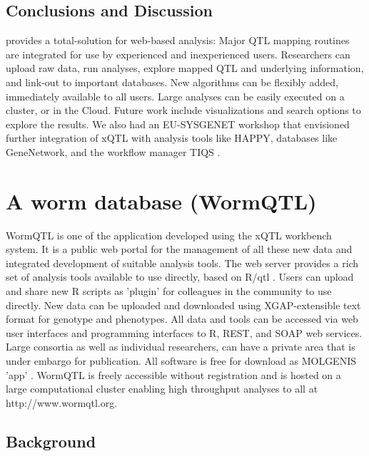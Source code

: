 \subsection{Conclusions and Discussion}
\xqtlwb provides a total-solution for web-based analysis: Major QTL mapping routines are integrated 
for use by experienced and inexperienced users. Researchers can upload raw data, run analyses, explore 
mapped QTL and underlying information, and link-out to important databases. New algorithms can be 
flexibly added, immediately available to all users. Large analyses can be easily executed on a cluster, 
or in the Cloud. Future work include visualizations and search options to explore the results. We also 
had an EU-SYSGENET workshop that envisioned further integration of xQTL with analysis tools like HAPPY, 
databases like GeneNetwork, and the workflow manager TIQS \cite{Durrant:2012}.

\section{A worm database (WormQTL)}
WormQTL is one of the application developed using the xQTL workbench system. It is a public web portal 
for the management of all these new data and integrated development of suitable analysis tools. The 
web server provides a rich set of analysis tools available to use directly, based on R/qtl 
\cite{Broman:2003, Arends:2010}. Users can upload and share new R scripts as 'plugin' for colleagues 
in the community to use directly. New data can be uploaded and downloaded using XGAP-extensible 
text format for genotype and phenotypes\cite{Swertz:2010a}. All data and tools can be accessed 
via web user interfaces and programming interfaces to R, REST, and SOAP web services. Large 
consortia as well as individual researchers, can have a private area that is under embargo for 
publication. All software is free for download as MOLGENIS 'app' \cite{Swertz:2010b}. WormQTL is 
freely accessible without registration and is hosted on a large computational cluster enabling 
high throughput analyses to all at http://www.wormqtl.org.

\subsection{Background}

